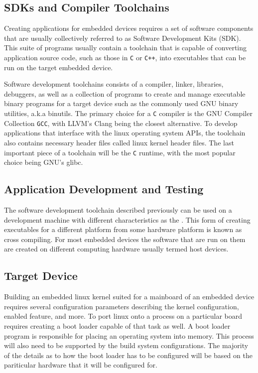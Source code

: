 \subsection{SDKs and Compiler Toolchains}

Creating applications for embedded devices requires a set of software components that are usually collectively referred to as Software Development Kits (SDK). This suite of programs usually contain a toolchain that is capable of converting application source code, such as those in \verb!C!  or \verb!C++!, into executables that can be run on the target embedded device.

Software development toolchains consists of a compiler, linker, libraries, debuggers, as well as a collection of programs to create and manage executable binary programs for a target device such as the commonly used GNU binary utilities, a.k.a binutils. The primary choice for a \verb!C! compiler is the GNU Compiler Collection \texttt{GCC}, with LLVM's Clang being the closest alternative. To develop applications that interface with the linux operating system APIs, the toolchain also contains necessary header files called linux kernel header files. The last important piece of a toolchain will be the \verb!C! runtime, with the most popular choice being GNU's glibc.

\subsection{Application Development and Testing}

The software development toolchain described previously can be used on a development machine with different characteristics as the . This form of creating executables for a different platform from some hardware platform is known as cross compiling. For most embedded devices the software that are run on them are created on different computing hardware usually termed host devices.

\subsection{Target Device}

Building an embedded linux kernel suited for a mainboard of an embedded device requires several configuration parameters describing the kernel configuration, enabled feature, and more. To port linux onto a process on a particular board requires creating a boot loader capable of that task as well. A boot loader program is responsible for placing an operating system into memory. This process will also need to be supported by the build system configurations. The majority of the details as to how the boot loader has to be configured will be based on the pariticular hardware that it will be configured for.


